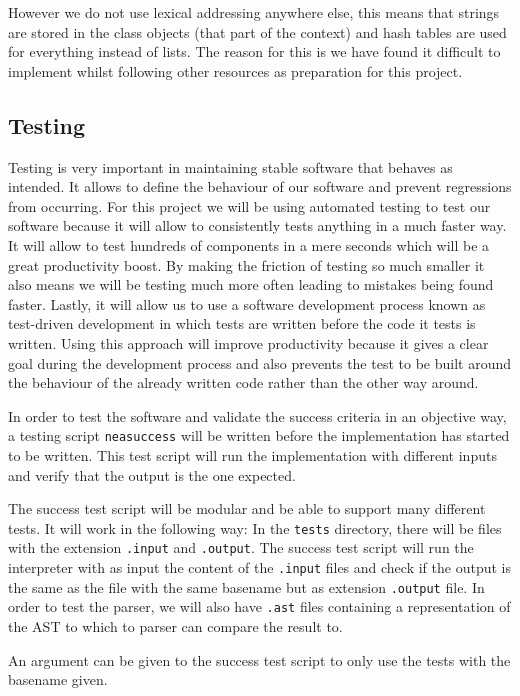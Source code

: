 \documentclass{article}
\begin{document}
However we do not use lexical addressing anywhere else, this means that strings
are stored in the class objects (that part of the context) and hash tables are
used for everything instead of lists. The reason for this is we have found it
difficult to implement whilst following other resources as preparation for this
project.

\subsection{Testing}

Testing is very important in maintaining stable software that behaves as
intended. It allows to define the behaviour of our software and prevent
regressions from occurring. For this project we will be using automated testing
to test our software because it will allow to consistently tests anything in a
much faster way. It will allow to test hundreds of components in a mere
seconds which will be a great productivity boost. By making the friction of
testing so much smaller it also means we will be testing much more often
leading to mistakes being found faster. Lastly, it will allow us to use a
software development process known as test-driven development in which tests
are written before the code it tests is written. Using this approach will
improve productivity because it gives a clear goal during the development
process and also prevents the test to be built around the behaviour of the
already written code rather than the other way around.

In order to test the software and validate the success criteria in an objective
way, a testing script \texttt{neasuccess} will be written before the
implementation has started to be written. This test script will run the
implementation with different inputs and verify that the output is the one
expected.

The success test script will be modular and be able to support many different
tests. It will work in the following way: In the \texttt{tests} directory,
there will be files with the extension \texttt{.input} and \texttt{.output}.
The success test script will run the interpreter with as input the content of
the \texttt{.input} files and check if the output is the same as the file with
the same basename but as extension \texttt{.output} file. In order to test the
parser, we will also have \texttt{.ast} files containing a representation of
the AST to which to parser can compare the result to.

An argument can be given to the success test script to only use the tests with
the basename given.
\end{document}
